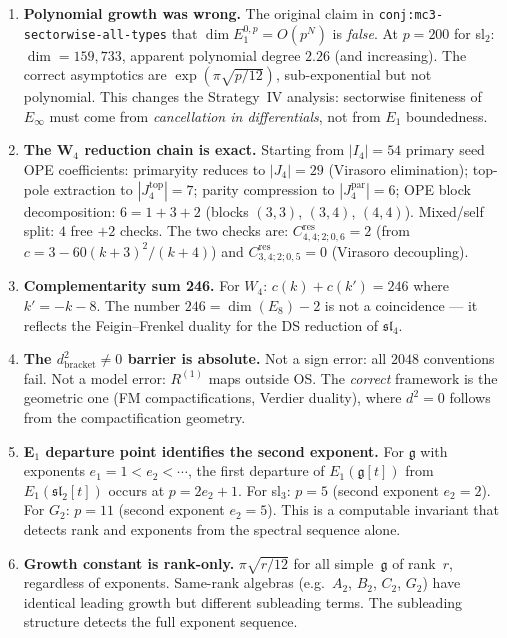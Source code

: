 \documentclass[11pt]{article}
\newcommand{\fg}{\mathfrak{g}}
\newcommand{\fsl}{\mathfrak{sl}}
\begin{document}
\begin{enumerate}[label=(\alph*)]
\item \textbf{Polynomial growth was wrong.}
  The original claim in \texttt{conj:mc3-sectorwise-all-types} that
  $\dim E_1^{0,p} = O(p^N)$ is \emph{false}.  At $p = 200$ for
  sl$_2$: $\dim = 159{,}733$, apparent polynomial degree $2.26$
  (and increasing).  The correct asymptotics are
  $\exp(\pi\sqrt{p/12})$, sub-exponential but not polynomial.
  This changes the Strategy~IV analysis: sectorwise finiteness of
  $E_\infty$ must come from \emph{cancellation in differentials},
  not from $E_1$ boundedness.

\item \textbf{The W$_4$ reduction chain is exact.}
  Starting from $|I_4| = 54$ primary seed OPE coefficients:
  primaryity reduces to $|J_4| = 29$ (Virasoro elimination);
  top-pole extraction to $|J_4^{\mathrm{top}}| = 7$;
  parity compression to $|J_4^{\mathrm{par}}| = 6$;
  OPE block decomposition: $6 = 1 + 3 + 2$ (blocks $(3,3)$,
  $(3,4)$, $(4,4)$).  Mixed/self split: $4$ free $+ 2$ checks.
  The two checks are: $C^{\mathrm{res}}_{4,4;2;0,6} = 2$ (from
  $c = 3 - 60(k+3)^2/(k+4)$) and $C^{\mathrm{res}}_{3,4;2;0,5} = 0$
  (Virasoro decoupling).

\item \textbf{Complementarity sum 246.}
  For $W_4$: $c(k) + c(k') = 246$ where $k' = -k - 8$.  The
  number $246 = \dim(E_8) - 2$ is not a coincidence --- it reflects
  the Feigin--Frenkel duality for the DS reduction of $\fsl_4$.

\item \textbf{The $d_{\mathrm{bracket}}^2 \neq 0$ barrier is absolute.}
  Not a sign error: all $2048$ conventions fail.  Not a model error:
  $R^{(1)}$ maps outside OS.  The \emph{correct} framework is the
  geometric one (FM compactifications, Verdier duality), where
  $d^2 = 0$ follows from the compactification geometry.

\item \textbf{E$_1$ departure point identifies the second exponent.}
  For $\fg$ with exponents $e_1 = 1 < e_2 < \cdots$, the first
  departure of $E_1(\fg[t])$ from $E_1(\fsl_2[t])$ occurs at
  $p = 2e_2 + 1$.  For sl$_3$: $p = 5$ (second exponent $e_2 = 2$).
  For $G_2$: $p = 11$ (second exponent $e_2 = 5$).  This is a
  computable invariant that detects rank and exponents from the
  spectral sequence alone.

\item \textbf{Growth constant is rank-only.}
  $\pi\sqrt{r/12}$ for all simple~$\fg$ of rank~$r$, regardless of
  exponents.  Same-rank algebras (e.g.\ $A_2$, $B_2$, $C_2$, $G_2$)
  have identical leading growth but different subleading terms.
  The subleading structure detects the full exponent sequence.
\end{enumerate}
\end{document}
